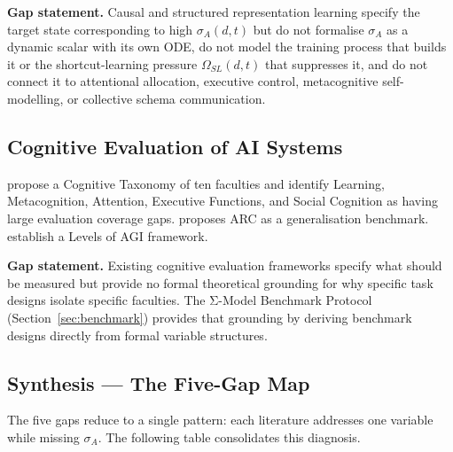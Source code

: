 \documentclass[11pt]{article}
\theoremstyle{definition}
\theoremstyle{plain}
\begin{document}
\textbf{Gap statement.} Causal and structured representation learning
specify the target state corresponding to high $\sigma_A(d,t)$ but do
not formalise $\sigma_A$ as a dynamic scalar with its own ODE, do not
model the training process that builds it or the shortcut-learning pressure
$\Omega_{SL}(d,t)$ \citep{geirhos2020shortcutlearning} that suppresses it, and do not connect it to
attentional allocation, executive control, metacognitive self-modelling,
or collective schema communication.

\subsection{Cognitive Evaluation of AI Systems}\label{sec:cognitive-eval}

\cite{burnell2026measuringprogressagi} propose a Cognitive Taxonomy of
ten faculties and identify Learning, Metacognition, Attention, Executive
Functions, and Social Cognition as having large evaluation coverage gaps.
\cite{chollet2019measureintelligence} proposes ARC as a generalisation
benchmark. \cite{morris2024levelsagi} establish a Levels of AGI framework.

\textbf{Gap statement.} Existing cognitive evaluation frameworks specify
what should be measured but provide no formal theoretical grounding for
why specific task designs isolate specific faculties. The Σ-Model Benchmark
Protocol (Section~\ref{sec:benchmark}) provides that grounding
by deriving benchmark designs directly from formal variable structures.

\subsection{Synthesis --- The Five-Gap Map}\label{sec:five-gap-map}

The five gaps reduce to a single pattern: each literature addresses
one variable while missing $\sigma_A$. The following table consolidates
this diagnosis.
\end{document}

